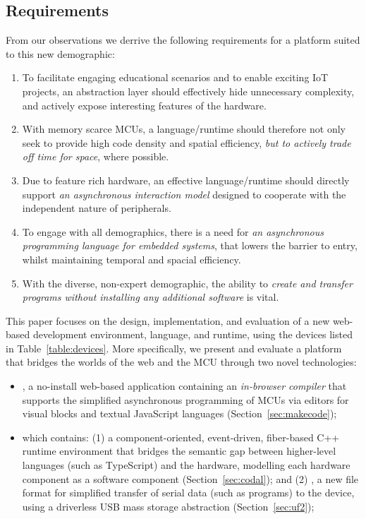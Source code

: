\subsection{Requirements}
\label{sec:requirements}

From our observations we derrive the following requirements for a platform suited to this new demographic:

\begin{enumerate}

    \item To facilitate engaging educational scenarios and to enable exciting IoT projects, an abstraction layer should effectively hide unnecessary complexity, and actively expose interesting features of the hardware.

    \item With memory scarce MCUs, a language/runtime should therefore not only seek to provide high code density and spatial efficiency, \emph{but to actively trade off time for space}, where possible.

    \item Due to feature rich hardware, an effective language/runtime should directly support \emph{an asynchronous interaction model} designed to cooperate with the independent nature of peripherals.

    \item To engage with all demographics, there is a need for \emph{an asynchronous programming language for embedded systems}, that lowers the barrier to entry, whilst maintaining temporal and spacial efficiency.

    \item With the diverse, non-expert demographic, the ability to \emph{create and transfer programs without installing any additional software} is vital.

\end{enumerate}

This paper focuses on the design, implementation, and evaluation of a new web-based development environment, language, and runtime, using the devices listed in Table~\ref{table:devices}. More specifically, we present and evaluate a platform that bridges the worlds of the web and the MCU through two novel technologies:

\begin{itemize}
\item \emph{\MCN}, a no-install web-based application containing an \emph{in-browser compiler} that supports the simplified asynchronous programming of MCUs via editors for visual blocks and textual JavaScript languages (Section~\ref{sec:makecode});

\item \emph{\CO} which contains: (1) a component-oriented, event-driven, fiber-based C++ runtime environment that bridges the semantic gap between higher-level languages (such as TypeScript) and the hardware, modelling each hardware component as a software component (Section~\ref{sec:codal});  and (2) \emph{\UF}, a new file format for simplified transfer of serial data (such as programs) to the device, using a driverless USB mass storage abstraction (Section~\ref{sec:uf2});

\end{itemize}

